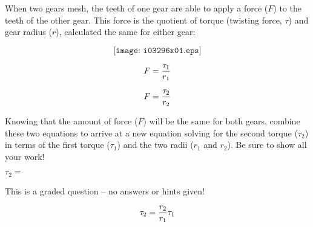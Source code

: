 

When two gears mesh, the teeth of one gear are able to apply a force ($F$) to the teeth of the other gear.  This force is the quotient of torque (twisting force, $\tau$) and gear radius ($r$), calculated the same for either gear:

$$\texttt{[image: i03296x01.eps]}$$

$$F = {\tau_1 \over r_1}$$

$$F = {\tau_2 \over r_2}$$

\vskip 30pt

Knowing that the amount of force ($F$) will be the same for both gears, combine these two equations to arrive at a new equation solving for the second torque ($\tau_2$) in terms of the first torque ($\tau_1$) and the two radii ($r_1$ and $r_2$).  Be sure to show all your work!

\vskip 50pt

$\tau_2 =$

\vfil 

\eject






This is a graded question -- no answers or hints given!







$$\tau_2 = {r_2 \over r_1} \tau_1$$




